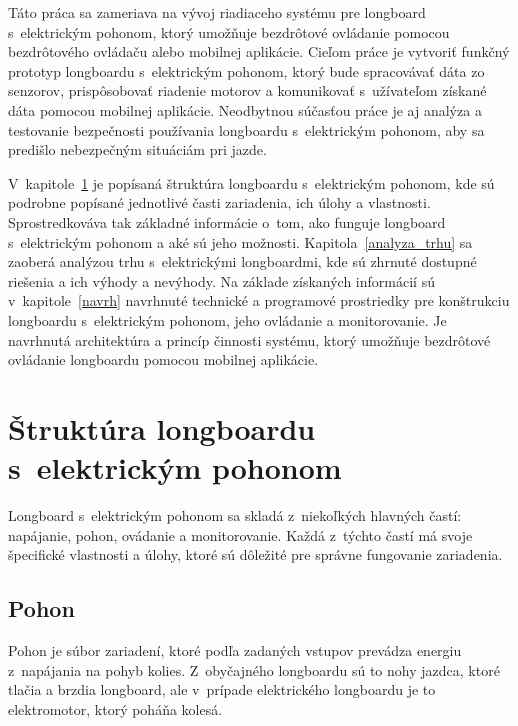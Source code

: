 Táto práca sa zameriava na vývoj riadiaceho systému pre longboard s~elektrickým pohonom, ktorý umožňuje bezdrôtové ovládanie pomocou bezdrôtového ovládaču alebo mobilnej aplikácie.
Cieľom práce je vytvoriť funkčný prototyp longboardu s~elektrickým pohonom, ktorý bude spracovávať dáta zo senzorov, prispôsobovať riadenie motorov a komunikovať s~užívateľom získané dáta pomocou mobilnej aplikácie.
Neodbytnou súčasťou práce je aj analýza a testovanie bezpečnosti používania longboardu s~elektrickým pohonom, aby sa predišlo nebezpečným situáciám pri jazde.

\bigskip

V~kapitole~\ref{struktura} je popísaná štruktúra longboardu s~elektrickým pohonom, kde sú podrobne popísané jednotlivé časti zariadenia, ich úlohy a vlastnosti.
Sprostredkováva tak základné informácie o~tom, ako funguje longboard s~elektrickým pohonom a aké sú jeho možnosti.
Kapitola~\ref{analyza_trhu} sa zaoberá analýzou trhu s~elektrickými longboardmi, kde sú zhrnuté dostupné riešenia a ich výhody a nevýhody.
Na základe získaných informácií sú v~kapitole~\ref{navrh} navrhnuté technické a programové prostriedky pre konštrukciu longboardu s~elektrickým pohonom, jeho ovládanie a monitorovanie.
Je navrhnutá architektúra a princíp činnosti systému, ktorý umožňuje bezdrôtové ovládanie longboardu pomocou mobilnej aplikácie.

\chapter{Štruktúra longboardu s~elektrickým pohonom}\label{struktura}

Longboard s~elektrickým pohonom sa skladá z~niekoľkých hlavných častí: napájanie, pohon, ovádanie a monitorovanie.
Každá z~týchto častí má svoje špecifické vlastnosti a úlohy, ktoré sú dôležité pre správne fungovanie zariadenia.\cite{WikiElectricSkateboard}

\section{Pohon}
Pohon je súbor zariadení, ktoré podľa zadaných vstupov prevádza energiu z~napájania na pohyb kolies.
Z~obyčajného longboardu sú to nohy jazdca, ktoré tlačia a brzdia longboard, ale v~prípade elektrického longboardu je to elektromotor, ktorý poháňa kolesá.

